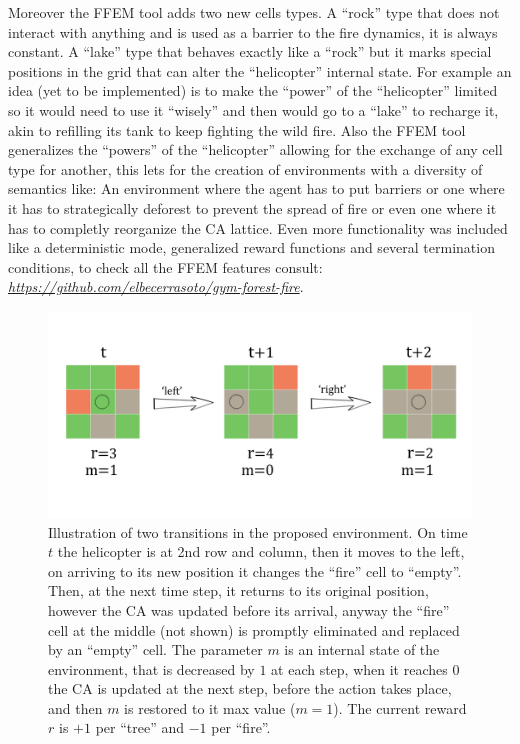 \documentclass[
  openany]{book}
\begin{document}
Moreover the FFEM tool adds two new cells types. A ``rock'' type that does not interact with anything and is used as a barrier to the fire dynamics, it is always constant. A ``lake'' type that behaves exactly like a ``rock'' but it marks special positions in the grid that can alter the ``helicopter'' internal state. For example an idea (yet to be implemented) is to make the ``power'' of the ``helicopter'' limited so it would need to use it ``wisely'' and then would go to a ``lake'' to recharge it, akin to refilling its tank to keep fighting the wild fire. Also the FFEM tool generalizes the ``powers'' of the ``helicopter'' allowing for the exchange of any cell type for another, this lets for the creation of environments with a diversity of semantics like: An environment where the agent has to put barriers or one where it has to strategically deforest to prevent the spread of fire or even one where it has to completly reorganize the CA lattice. Even more functionality was included like a deterministic mode, generalized reward functions and several termination conditions, to check all the FFEM features consult: \emph{\url{https://github.com/elbecerrasoto/gym-forest-fire}}.



\begin{figure}

{\centering \includegraphics[width=0.8\linewidth]{pics/agent-env_3x3} 

}

\caption{Illustration of two transitions in the proposed environment. On time \(t\) the helicopter is at 2nd row and column, then it moves to the left, on arriving to its new position it changes the ``fire'' cell to ``empty''. Then, at the next time step, it returns to its original position, however the CA was updated before its arrival, anyway the ``fire'' cell at the middle (not shown) is promptly eliminated and replaced by an ``empty'' cell. The parameter \(m\) is an internal state of the environment, that is decreased by \(1\) at each step, when it reaches \(0\) the CA is updated at the next step, before the action takes place, and then \(m\) is restored to it max value (\(m=1\)). The current reward \(r\) is \(+1\) per ``tree'' and \(-1\) per ``fire''.}\label{fig:thesis-3-3-env}
\end{figure}
\end{document}
